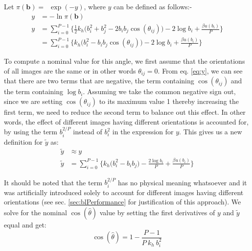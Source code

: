         Let $\pi(\mathbf{b}) = $~$ \exp (-y)$, where $y$ can be defined as follows:-
        \begin{equation}
        \label{eq:y}
            \begin{aligned}
                y &= -\ln \pi(\mathbf{b})\\
                y &= \displaystyle\sum\limits_{i=0}^{P-1} \Bigg\{ \frac{1}{2}  k_h  \Big( b_i^2 + b_j^2 - 2  b_i  b_j  \cos (\theta_{ij}) \Big) - 2  \log b_i + \frac{ \beta  u (b_i)}{P} \Bigg\}\\
                &= \displaystyle\sum\limits_{i=0}^{P-1} \Bigg\{ k_h  \Big( b_i^2 - b_i  b_j  \cos (\theta_{ij}) \Big) - 2  \log b_i + \frac{ \beta  u (b_i)}{P} \Bigg\}
            \end{aligned}
        \end{equation}

        To compute a nominal value for this angle, we first assume that the orientations of all images are the same or in other words $\theta_{ij} = 0$. From eq. \eqref{eq:y}, we can see that there are two terms that are negative, the term containing $\cos (\theta_{ij})$ and the term containing $\log b_i$. Assuming we take the common negative sign out, since we are setting $\cos (\theta_{ij})$ to its maximum value 1 thereby increasing the first term, we need to reduce the second term to balance out this effect. In other words, the effect of different images having different orientations is accounted for, by using the term $b_i^{2/P}$ instead of $b_i^2$ in the expression for $y$. This gives us a new definition for $\tilde y$ as:
        \begin{equation}
        \label{eq:ytilde}
            \begin{aligned}
                \tilde y &\approx y\\
                \tilde y &= \displaystyle\sum\limits_{i=0}^{P-1} \Bigg\{ k_h  \Big( b_i^2 - b_i  b_j \Big) - \frac{2  \log b_i}{P} + \frac{ \beta  u (b_i)}{P} \Bigg\}
            \end{aligned}
        \end{equation}

        It should be noted that the term $b_i^{2/P}$ has no physical meaning whatsoever and it was artificially introduced solely to account for different images having different orientations (see sec. \ref{sec:blPerformance} for justification of this approach). We solve for the nominal $\cos (\hat \theta)$ value by setting the first derivatives of $y$ and $\tilde y$ equal and get:
        \begin{equation}
        \label{eq:thetaHat}
            \cos (\hat \theta) = 1 - \frac{P-1}{P~k_h~b_i^2}
        \end{equation}

